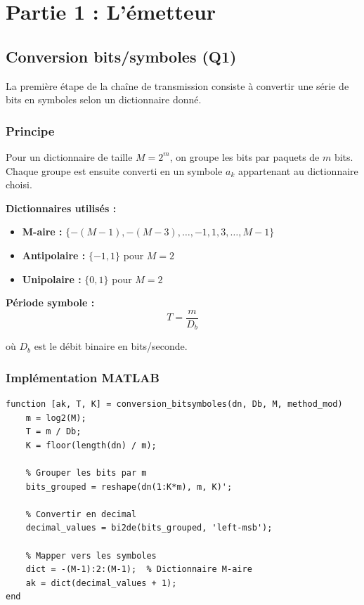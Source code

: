 \documentclass[12pt,a4paper]{article}
\begin{document}
\newpage

\section{Partie 1 : L'émetteur}

\subsection{Conversion bits/symboles (Q1)}

La première étape de la chaîne de transmission consiste à convertir une série de bits en symboles selon un dictionnaire donné.

\subsubsection{Principe}

Pour un dictionnaire de taille $M = 2^m$, on groupe les bits par paquets de $m$ bits. Chaque groupe est ensuite converti en un symbole $a_k$ appartenant au dictionnaire choisi.

\textbf{Dictionnaires utilisés :}

\begin{itemize}
    \item \textbf{M-aire :} $\{-(M-1), -(M-3), \ldots, -1, 1, 3, \ldots, M-1\}$
    \item \textbf{Antipolaire :} $\{-1, 1\}$ pour $M=2$
    \item \textbf{Unipolaire :} $\{0, 1\}$ pour $M=2$
\end{itemize}

\textbf{Période symbole :}
\begin{equation}
    T = \frac{m}{D_b}
\end{equation}

où $D_b$ est le débit binaire en bits/seconde.

\subsubsection{Implémentation MATLAB}

\begin{lstlisting}[caption=Fonction conversion\_bitsymboles]
function [ak, T, K] = conversion_bitsymboles(dn, Db, M, method_mod)
    m = log2(M);
    T = m / Db;
    K = floor(length(dn) / m);
    
    % Grouper les bits par m
    bits_grouped = reshape(dn(1:K*m), m, K)';
    
    % Convertir en decimal
    decimal_values = bi2de(bits_grouped, 'left-msb');
    
    % Mapper vers les symboles
    dict = -(M-1):2:(M-1);  % Dictionnaire M-aire
    ak = dict(decimal_values + 1);
end
\end{lstlisting}
\end{document}
